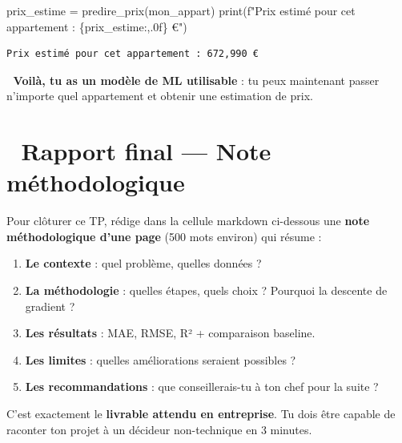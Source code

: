 \documentclass[
  french,
  11pt,
  a4paper,
]{scrbook}
\newenvironment{Shaded}{}{}
\newcommand{\BuiltInTok}[1]{\textcolor[rgb]{0.84,0.23,0.29}{#1}}
\newcommand{\NormalTok}[1]{\textcolor[rgb]{0.14,0.16,0.18}{#1}}
\newcommand{\OperatorTok}[1]{\textcolor[rgb]{0.14,0.16,0.18}{#1}}
\newcommand{\SpecialCharTok}[1]{\textcolor[rgb]{0.00,0.36,0.77}{#1}}
\newcommand{\SpecialStringTok}[1]{\textcolor[rgb]{0.01,0.18,0.38}{#1}}
\providecommand{\tightlist}{%
  \setlength{\itemsep}{0pt}\setlength{\parskip}{0pt}}
\begin{document}
\begin{tcolorbox}
\begin{Shaded}
\begin{Highlighting}[]
\NormalTok{prix\_estime }\OperatorTok{=}\NormalTok{ predire\_prix(mon\_appart)}
\BuiltInTok{print}\NormalTok{(}\SpecialStringTok{f"Prix estimé pour cet appartement : }\SpecialCharTok{\{}\NormalTok{prix\_estime}\SpecialCharTok{:,.0f\}}\SpecialStringTok{ €"}\NormalTok{)}
\end{Highlighting}
\end{Shaded}

\begin{verbatim}
Prix estimé pour cet appartement : 672,990 €
\end{verbatim}

🎉 \textbf{Voilà, tu as un modèle de ML utilisable} : tu peux maintenant
passer n'importe quel appartement et obtenir une estimation de prix.

\end{tcolorbox}

\chapter{📝 Rapport final --- Note
méthodologique}\label{rapport-final-note-muxe9thodologique}

\begin{tcolorbox}[enhanced jigsaw, arc=.35mm, bottomrule=.15mm, bottomtitle=1mm, breakable, colback=white, colbacktitle=quarto-callout-important-color!10!white, colframe=quarto-callout-important-color-frame, coltitle=black, left=2mm, leftrule=.75mm, opacityback=0, opacitybacktitle=0.6, rightrule=.15mm, title={🏁 Ta dernière tâche}, titlerule=0mm, toprule=.15mm, toptitle=1mm]

Pour clôturer ce TP, rédige dans la cellule markdown ci-dessous une
\textbf{note méthodologique d'une page} (500 mots environ) qui résume :

\begin{enumerate}
\def\labelenumi{\arabic{enumi}.}
\tightlist
\item
  \textbf{Le contexte} : quel problème, quelles données ?
\item
  \textbf{La méthodologie} : quelles étapes, quels choix ? Pourquoi la
  descente de gradient ?
\item
  \textbf{Les résultats} : MAE, RMSE, R² + comparaison baseline.
\item
  \textbf{Les limites} : quelles améliorations seraient possibles ?
\item
  \textbf{Les recommandations} : que conseillerais-tu à ton chef pour la
  suite ?
\end{enumerate}

C'est exactement le \textbf{livrable attendu en entreprise}. Tu dois
être capable de raconter ton projet à un décideur non-technique en 3
minutes.

\end{tcolorbox}
\end{document}
